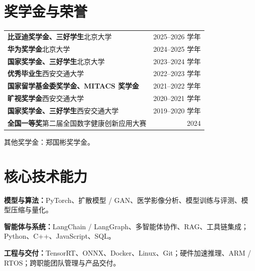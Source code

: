 \documentclass[10pt,a4paper]{article}
\begin{document}
\section{奖学金与荣誉}
\begin{tabularx}{\linewidth}{@{}>{\raggedright\arraybackslash}X r@{}}
\textbf{比亚迪奖学金、三好学生}\quad 北京大学 & 2025--2026 学年\\[3pt]
\textbf{华为奖学金}\quad 北京大学 & 2024--2025 学年\\[3pt]
\textbf{国家奖学金、三好学生}\quad 北京大学 & 2023--2024 学年\\[3pt]
\textbf{优秀毕业生}\quad 西安交通大学 & 2022--2023 学年\\[3pt]
\textbf{国家留学基金委奖学金、MITACS 奖学金} & 2021--2022 学年\\[3pt]
\textbf{旷视奖学金}\quad 西安交通大学 & 2020--2021 学年\\[3pt]
\textbf{国家奖学金、三好学生}\quad 西安交通大学 & 2019--2020 学年\\[3pt]
\textbf{全国一等奖}\quad 第二届全国数字健康创新应用大赛 & 2024\\
\end{tabularx}\par
{\small\color{muted}其他奖学金：郑国彬奖学金。}

\section{核心技术能力}
{\small
\textbf{模型与算法：}PyTorch、扩散模型 / GAN、医学影像分析、模型训练与评测、模型压缩与量化。\par
\textbf{智能体与系统：}LangChain / LangGraph、多智能体协作、RAG、工具链集成；Python、C++、JavaScript、SQL。\par
\textbf{工程与交付：}TensorRT、ONNX、Docker、Linux、Git；硬件加速推理、ARM / RTOS；跨职能团队管理与产品交付。
}
\end{document}
